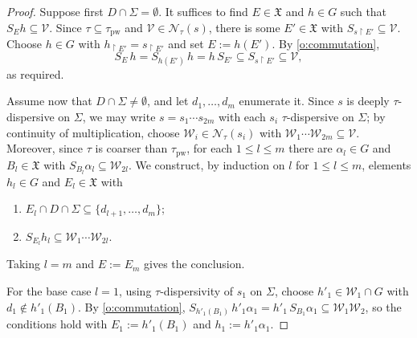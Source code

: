 \documentclass{article}
\theoremstyle{remark}
\theoremstyle{definition}
\newcommand{\nn}[0]{S}%
\newcommand{\V}[0]{\mathcal{V}}
\newcommand{\W}[0]{\mathcal{W}}
\newcommand{\pw}[0]{\tau_{\mathrm{pw}}}
\newcommand{\X}[0]{\mathfrak{X}}
\renewcommand\leq{\leqslant}
\begin{document}
{{{{{  \begin{proof}
{Suppose first $D \cap \Sigma=\emptyset$. It suffices to find $E\in\X$ and $h\in G$ such that $\nn_E h\subseteq\V$. Since $\tau\subseteq\pw$ and $\V\in\mathcal{N}_\tau(s)$, there is some $E'\in\X$ with $\nn_{s\upharpoonright E'}\subseteq \V$. Choose $h\in G$ with $h_{\upharpoonright E'}=s_{\upharpoonright E'}$ and set $E:=h(E')$.   By
\cref{o:commutation},
\[
  \nn_{E}\, h = \nn_{h(E')}\, h = h\, \nn_{E'} \subseteq \nn_{s \upharpoonright E'}
    \subseteq \V,
\]
as required. }

{Assume now that $D \cap \Sigma \neq \emptyset$, and let $d_1, \dots, d_m$ enumerate it.
Since $s$ is deeply $\tau$-dispersive on $\Sigma$, we may write $s = s_1 \cdots s_{2m}$
with each $s_i$ $\tau$-dispersive on $\Sigma$; by continuity of multiplication, choose
$\W_i \in \mathcal{N}_\tau(s_i)$ with $\W_1 \cdots \W_{2m} \subseteq \V$. Moreover, since
$\tau$ is coarser than $\pw$, for each $1 \leq l \leq m$ there are $\alpha_l \in G$ and
$B_l \in \X$ with $\nn_{B_l} \alpha_l \subseteq \W_{2l}$.} 
 We construct, by
  induction on $l$ for $1 \le l \le m$, elements $h_l \in G$ and $E_l \in \X$ with
  \begin{enumerate}
    \item\label{induction assumption1} $E_l \cap D \cap \Sigma \subseteq \{d_{l+1}, \dots, d_m\}$;
    \item\label{induction assumption2} $\nn_{E_l} h_l \subseteq \W_1 \cdots \W_{2l}$.
  \end{enumerate}
  Taking $l = m$ and $E := E_m$ gives the conclusion. %

    
    
    For the base case $l=1$, %
     using $\tau$-dispersivity of $s_1$ on $\Sigma$, choose
  $h'_1 \in \W_1 \cap G$ with $d_1 \notin h'_1(B_1)$. By \cref{o:commutation},
  $\nn_{h'_1(B_1)}\, h'_1 \alpha_1 = h'_1\, \nn_{B_1} \alpha_1 \subseteq \W_1 \W_2$, so the
  conditions hold with $E_1 := h'_1(B_1)$ and $h_1 := h'_1 \alpha_1$.


\end{proof}}}}}}
\end{document}
